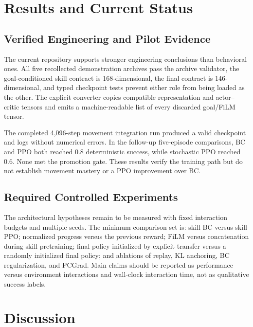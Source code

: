 \documentclass[11pt,a4paper]{article}
\begin{document}
\section{Results and Current Status}
\label{sec:results}

\subsection{Verified Engineering and Pilot Evidence}

The current repository supports stronger engineering conclusions than behavioral ones.
All five recollected demonstration archives pass the archive validator, the goal-conditioned
skill contract is 168-dimensional, the final contract is 146-dimensional, and typed
checkpoint tests prevent either role from being loaded as the other. The explicit converter
copies compatible representation and actor--critic tensors and emits a machine-readable
list of every discarded goal/FiLM tensor.

The completed 4,096-step movement integration run produced a valid checkpoint and logs
without numerical errors. In the follow-up five-episode comparisons, BC and PPO both
reached 0.8 deterministic success, while stochastic PPO reached 0.6. None met the
promotion gate. These results verify the training path but do not establish movement
mastery or a PPO improvement over BC.

\subsection{Required Controlled Experiments}

The architectural hypotheses remain to be measured with fixed interaction budgets and
multiple seeds. The minimum comparison set is: skill BC versus skill PPO; normalized
progress versus the previous reward; FiLM versus concatenation during skill pretraining;
final policy initialized by explicit transfer versus a randomly initialized final policy;
and ablations of replay, KL anchoring, BC regularization, and PCGrad. Main claims should be
reported as performance versus environment interactions and wall-clock interaction time,
not as qualitative success labels.

\section{Discussion}
\label{sec:discussion}
\end{document}
